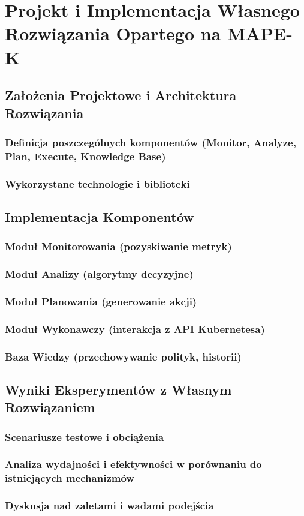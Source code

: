 \newpage

\section{Projekt i Implementacja Własnego Rozwiązania Opartego na MAPE-K}

\subsection{Założenia Projektowe i Architektura Rozwiązania}

\subsubsection{Definicja poszczególnych komponentów (Monitor, Analyze, Plan, Execute, Knowledge Base)}

\subsubsection{Wykorzystane technologie i biblioteki}

\subsection{Implementacja Komponentów}

\subsubsection{Moduł Monitorowania (pozyskiwanie metryk)}

\subsubsection{Moduł Analizy (algorytmy decyzyjne)}

\subsubsection{Moduł Planowania (generowanie akcji)}

\subsubsection{Moduł Wykonawczy (interakcja z API Kubernetesa)}

\subsubsection{Baza Wiedzy (przechowywanie polityk, historii)}

\subsection{Wyniki Eksperymentów z Własnym Rozwiązaniem}

\subsubsection{Scenariusze testowe i obciążenia}

\subsubsection{Analiza wydajności i efektywności w porównaniu do istniejących mechanizmów}

\subsubsection{Dyskusja nad zaletami i wadami podejścia}